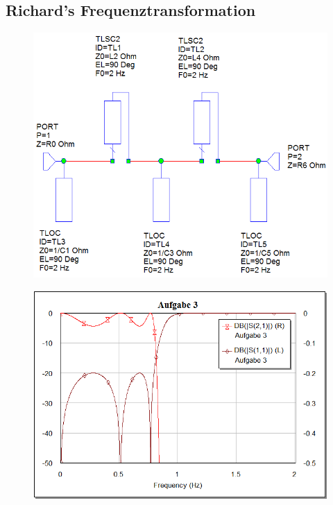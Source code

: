 \subsection{Richard's Frequenztransformation}

\begin{figure}[h!]
    \centering
    \includegraphics[width=\imagewidth]{images/stripline-richards}
    \caption{}
\end{figure}

\begin{figure}[h!]
    \centering
    \includegraphics[width=\imagewidth]{images/graph-richards}
    \caption{}
\end{figure}


